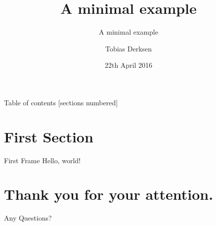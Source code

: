 \documentclass{beamer}
\title{A minimal example}
\subtitle{A minimal example}
\date{22th April 2016}
\author{Tobias Derksen}
\institute{Fontys School of Technology \& Logistics}
\begin{document}
  \maketitle

  \begin{frame}{Table of contents}
    [sections numbered]
    \tableofcontents[hideallsubsections]
  \end{frame}


  \section{First Section}
  \begin{frame}{First Frame}
    Hello, world!
  \end{frame}
  
  
  
  
	\section*{Thank you for your attention.}
	\begin{frame}[standout]
		Any Questions?
	\end{frame}
\end{document}
